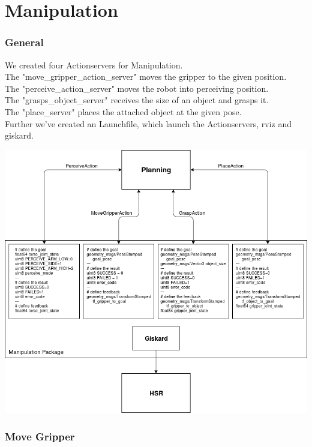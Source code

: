 \documentclass[main.tex]{subfiles}
\begin{document}
	
	\chapter{Manipulation}
	
	\subsection{General}
	We created four Actionservers for Manipulation.\\
	The "move\_gripper\_action\_server" moves the gripper to the given position.\\
	The "perceive\_action\_server" moves the robot into perceiving position.\\
	The "grasps\_object\_server" receives the size of an object and grasps it.\\
	The "place\_server" places the attached object at the given pose.\\
	Further we've created an Launchfile, which launch the Actionservers, rviz and giskard.
	
	\includegraphics[scale=0.5]{Manipulation.png}
	
	\subsection{Move Gripper}
	
	\vspace{1cm}
	
\end{document}
